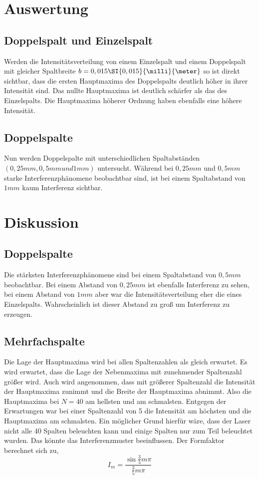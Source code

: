 \section{Auswertung}
\subsection{Doppelspalt und Einzelspalt}
Werden die Intensitätsverteilung von einem Einzelspalt und einem Doppelspalt mit gleicher Spaltbreite $ b= 0,015\SI{0,015}{\milli}{\meter} $ so ist direkt sichtbar, dass die ersten Hauptmaxima des Doppelspalts deutlich höher in ihrer Intensität sind. Das nullte Hauptmaxima ist deutlich schärfer als das des Einzelspalts. Die Hauptmaxima höherer Ordnung haben ebenfalls eine höhere Intensität.
\subsection{Doppelspalte}
Nun werden Doppelspalte mit unterschiedlichen Spaltabständen $ ( 0,25mm,0,5mm und 1mm) $ untersucht.
Während bei $ 0,25mm $ und $ 0,5mm $ starke Interferenzphänomene beobachtbar sind, ist bei einem Spaltabstand von $ 1mm $ kaum Interferenz sichtbar.
\section{Diskussion}
\subsection{Doppelspalte}
Die stärksten Interferenzphänomene sind bei einem Spaltabstand von $ 0,5mm $ beobachtbar. Bei einem Abstand von $ 0,25mm $ ist ebenfalls Interferenz zu sehen, bei einem Abstand von $ 1mm $ aber war die Intensitätsverteilung eher die eines Einzelspalts. Wahrscheinlich ist dieser Abstand zu groß um Interferenz zu erzeugen.
\subsection{Mehrfachspalte}
Die Lage der Hauptmaxima wird bei allen Spaltenzahlen als gleich erwartet. Es wird erwartet, dass die Lage der Nebenmaxima mit zunehmender Spaltenzahl größer wird. Auch wird angenommen, dass mit größerer Spaltenzahl die Intensität der Hauptmaxima zunimmt und die Breite der Hauptmaxima abnimmt. Also die Hauptmaxima bei $ N=40 $ am hellsten und am schmalsten.
Entgegen der Erwartungen war bei einer Spaltenzahl von 5 die Intensität am höchsten und die Hauptmaxima am schmalsten.
Ein möglicher Grund hierfür wäre, dass der Laser nicht alle 40 Spalten beleuchten kann und einige Spalten nur zum Teil beleuchtet wurden. Das könnte das Interferenzmuster beeinflussen.
Der Formfaktor berechnet sich zu,
\begin{equation}
I_{m}=\frac{\sin \frac{3}{5} m \pi}{\frac{3}{5} m \pi}
\end{equation}
